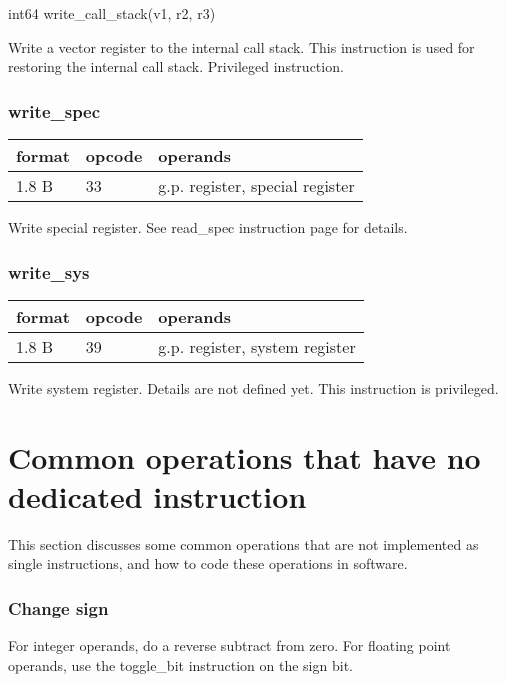\documentclass[forwardcom.tex]{subfiles}
\begin{document}
int64 write\_call\_stack(v1, r2, r3)
\vspace{2mm}

Write a vector register to the internal call stack. This instruction is used for restoring the internal call stack.
Privileged instruction.
\vspace{2mm}

\subsubsection{write\_spec}
\label{table:writeSpecInstruction}
\begin{tabular}{|p{12mm}|p{12mm}|p{110mm}|}
\hline
\bfseries format & \bfseries opcode & \bfseries operands \\ \hline
1.8 B & 33 & g.p. register, special register \\ \hline
\end{tabular}
\vspace{2mm}

Write special register. See read\_spec instruction page \pageref{table:readSpecInstruction} for details.

\subsubsection{write\_sys}
\label{table:writeSysInstruction}
\begin{tabular}{|p{12mm}|p{12mm}|p{110mm}|}
\hline
\bfseries format & \bfseries opcode & \bfseries operands \\ \hline
1.8 B & 39 & g.p. register, system register \\ \hline
\end{tabular}
\vspace{2mm}

Write system register. Details are not defined yet. This instruction is privileged.
\vspace{2mm}


\section{Common operations that have no dedicated instruction}
This section discusses some common operations that are not implemented as single instructions, and how to code these operations in software.

\subsubsection{Change sign}
For integer operands, do a reverse subtract from zero. For floating point operands, use the toggle\_bit instruction on the sign bit.
\end{document}

